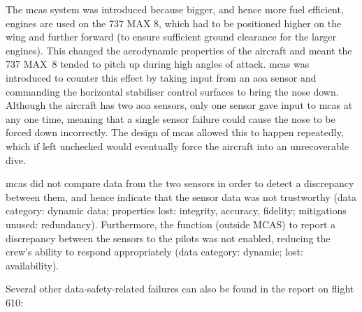 The \gls{mcas} system was introduced because bigger, and hence more fuel efficient, engines are used on the 737 MAX 8, which had to be positioned higher on the wing and further forward (to ensure sufficient ground clearance for the larger engines). This changed the aerodynamic properties of the aircraft and meant the 737 MAX~8 tended to pitch up during high angles of attack. \Gls{mcas} was introduced to counter this effect by taking input from an \gls{aoa} sensor and commanding the horizontal stabiliser control surfaces to bring the nose down. Although the aircraft has two \gls{aoa} sensors, only one sensor gave input to \gls{mcas} at any one time, meaning that a single sensor failure could cause the nose to be forced down incorrectly. The design of \gls{mcas} allowed this to happen repeatedly, which if left unchecked would eventually force the aircraft into an unrecoverable dive.

\Gls{mcas} did not compare data from the two sensors in order to detect a discrepancy between them, and hence indicate that the sensor data was not trustworthy (data category: {dynamic data}; properties lost: \gls{integrity}, \gls{accuracy}, \gls{fidelity}; \glspl{mitigation} unused: redundancy). Furthermore, the function (outside MCAS) to report a discrepancy between the sensors to the pilots was not enabled, reducing the crew's ability to respond appropriately (data category: dynamic;  lost: \gls{availability}).

Several other data-safety-related failures can also be found in the report on flight 610:

